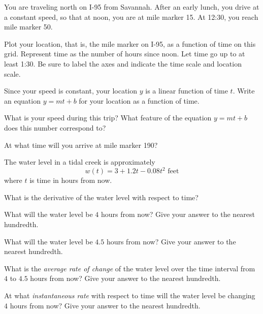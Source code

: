 
You are traveling north on I-95 from Savannah.
After an early lunch, you drive at a constant speed, so that at noon, you are at mile marker 15.
At 12:30, you reach mile marker 50.

\begin{ProblemSet}
 \begin{Problem}[pencil space=0in]
  Plot your location, that is, the mile marker on I-95, as a function of time on this grid.
  Represent time as the number of hours since noon.
  Let time go up to at least 1:30.
  Be sure to label the axes and indicate the time scale and location scale.

  \bigskip
  \GraphingGridSmall

 \end{Problem}
 \begin{Problem}
  Since your speed is constant, your location $y$ is a linear function of time $t$.
  Write an equation $y = m t + b$ for your location as a function of time.
 \end{Problem}
 \begin{Problem}[pencil space=0.5in]
  What is your speed during this trip?
  What feature of the equation $y = m t + b$ does this number correspond to?
 \end{Problem}
 \begin{Problem}[pencil space=0.5in]
  At what time will you arrive at mile marker 190?
 \end{Problem}
\end{ProblemSet}

\newpage
The water level in a tidal creek is approximately
\begin{equation*}
 w(t) = 3 + 1.2 t - 0.08 t^2 \text{ feet}
\end{equation*}
where $t$ is time in hours from now.

\begin{ProblemSet}[pencil space=2in]
 \begin{Problem}
  What is the derivative of the water level with respect to time?
 \end{Problem}
 \begin{Problem}
  What will the water level be $4$ hours from now?
  Give your answer to the nearest hundredth.
 \end{Problem}
 \begin{Problem}
  What will the water level be $4.5$ hours from now?
  Give your answer to the nearest hundredth.
 \end{Problem}
 \begin{Problem}
  What is the \emph{average rate of change} of the water level over the time interval from $4$ to $4.5$ hours from now?
  Give your answer to the nearest hundredth.
 \end{Problem}
 \begin{Problem}
  At what \emph{instantaneous rate} with respect to time will the water level be changing $4$ hours from now?
  Give your answer to the nearest hundredth.
 \end{Problem}
\end{ProblemSet}

